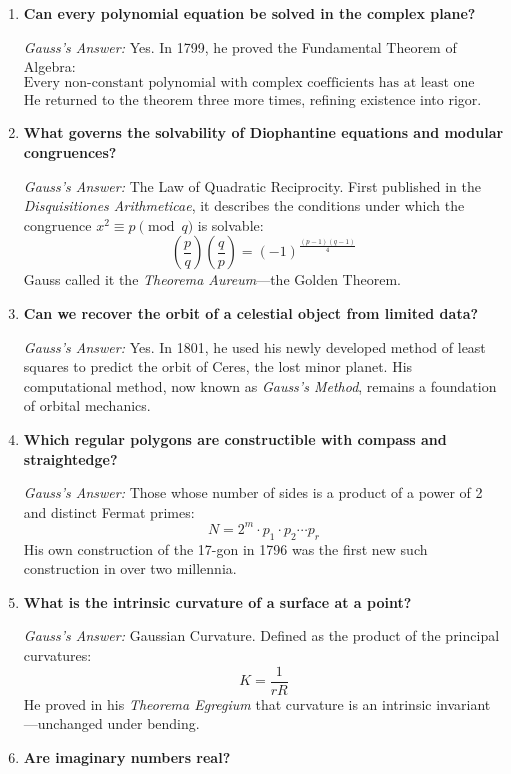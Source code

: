 \documentclass[9pt]{article}
\begin{document}
\begin{enumerate}
  \item \textbf{Can every polynomial equation be solved in the complex plane?}

  \textit{Gauss’s Answer:} Yes. In 1799, he proved the Fundamental Theorem of Algebra:  
  \[
  \text{Every non-constant polynomial with complex coefficients has at least one complex root.}
  \]
  He returned to the theorem three more times, refining existence into rigor.

  \item \textbf{What governs the solvability of Diophantine equations and modular congruences?}

  \textit{Gauss’s Answer:} The Law of Quadratic Reciprocity.  
  First published in the \textit{Disquisitiones Arithmeticae}, it describes the conditions under which the congruence \( x^2 \equiv p \pmod{q} \) is solvable:
  \[
  \left( \frac{p}{q} \right) \left( \frac{q}{p} \right) = (-1)^{\frac{(p-1)(q-1)}{4}}
  \]
  Gauss called it the \textit{Theorema Aureum}—the Golden Theorem.

  \item \textbf{Can we recover the orbit of a celestial object from limited data?}

  \textit{Gauss’s Answer:} Yes. In 1801, he used his newly developed method of least squares to predict the orbit of Ceres, the lost minor planet.  
  His computational method, now known as \textit{Gauss’s Method}, remains a foundation of orbital mechanics.

  \item \textbf{Which regular polygons are constructible with compass and straightedge?}

  \textit{Gauss’s Answer:} Those whose number of sides is a product of a power of 2 and distinct Fermat primes:
  \[
  N = 2^m \cdot p_1 \cdot p_2 \cdots p_r
  \]
  His own construction of the 17-gon in 1796 was the first new such construction in over two millennia.

  \item \textbf{What is the intrinsic curvature of a surface at a point?}

  \textit{Gauss’s Answer:} Gaussian Curvature.  
  Defined as the product of the principal curvatures:
  \[
  K = \frac{1}{rR}
  \]
  He proved in his \textit{Theorema Egregium} that curvature is an intrinsic invariant—unchanged under bending.

  \item \textbf{Are imaginary numbers real?}


\end{enumerate}
\end{document}
